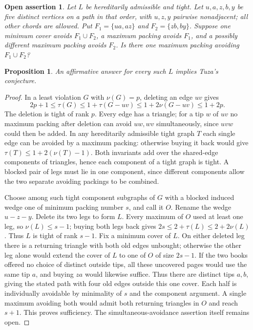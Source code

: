 \documentclass[11pt,a4paper]{amsart}
\newtheorem{proposition}[theorem]{Proposition}
\newtheorem*{question}{Open assertion}
\begin{document}
\begin{question}
Let $L$ be hereditarily admissible and tight. Let $u,a,z,b,y$
be five distinct vertices on a path in that order, with $u,z,y$
pairwise nonadjacent; all other chords are allowed. Put
$F_1=\{ua,az\}$ and $F_2=\{zb,by\}$. Suppose one minimum cover
avoids $F_1\cup F_2$, a maximum packing avoids $F_1$, and a
possibly different maximum packing avoids $F_2$. Is there one
maximum packing avoiding $F_1\cup F_2$?
\end{question}

\begin{proposition}
An affirmative answer for every such $L$ implies Tuza's conjecture.
\end{proposition}
\begin{proof}
In a least violation $G$ with $\nu(G)=p$, deleting an edge $uv$
gives
\[
 2p+1\le\tau(G)\le1+\tau(G-uv)\le1+2\nu(G-uv)\le1+2p .
\]
The deletion is tight of rank $p$. Every edge has a triangle;
for a tip $w$ of $uv$ no maximum packing after deletion can
avoid $uw,wv$ simultaneously, since $uvw$ could then be added.
In any hereditarily admissible tight graph $T$ each single edge
can be avoided by a maximum packing: otherwise buying it back
would give $\tau(T)\le1+2(\nu(T)-1)$. Both invariants add over
the shared-edge components of triangles, hence each component
of a tight graph is tight. A blocked pair of legs must lie in
one component, since different components allow the two separate
avoiding packings to be combined.

Choose among such tight component subgraphs of $G$ with a blocked
induced wedge one of minimum packing number $s$, and call it $O$.
Rename the wedge $u-z-y$. Delete its two legs to form $L$. Every
maximum of $O$ used at least one leg, so $\nu(L)\le s-1$;
buying both legs back gives $2s\le2+\tau(L)\le2+2\nu(L)$.
Thus $L$ is tight of rank $s-1$. Fix a minimum cover of $L$.
On either deleted leg there is a returning triangle with both
old edges unbought; otherwise the other leg alone would extend
the cover of $L$ to one of $O$ of size $2s-1$. If the two
books offered no choice of distinct outside tips, all these
uncovered pages would use the same tip $a$, and buying $za$
would likewise suffice. Thus there are distinct tips $a,b$,
giving the stated path with four old edges outside this one
cover. Each half is individually avoidable by minimality of $s$
and the component argument. A single maximum avoiding both
would admit both returning triangles in $O$ and reach $s+1$.
This proves sufficiency. The simultaneous-avoidance assertion
itself remains open.
\end{proof}
\end{document}
